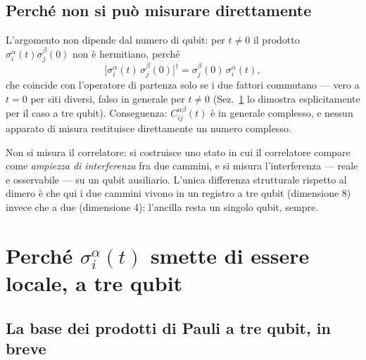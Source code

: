 \documentclass[11pt,a4paper]{article}
\begin{document}
\subsection{Perché non si può misurare direttamente}

L'argomento non dipende dal numero di qubit: per $t\neq0$ il prodotto
$\sigma_i^\alpha(t)\sigma_j^\beta(0)$ non è hermitiano, perché
\begin{equation}
\big[\sigma_i^\alpha(t)\,\sigma_j^\beta(0)\big]^\dagger
= \sigma_j^\beta(0)\,\sigma_i^\alpha(t),
\end{equation}
che coincide con l'operatore di partenza solo se i due fattori commutano --- vero a $t=0$ per siti
diversi, falso in generale per $t\neq0$ (Sez.~\ref{sec:spalmamento} lo dimostra esplicitamente per
il caso a tre qubit). Conseguenza: $C_{ij}^{\alpha\beta}(t)$ è in generale complesso, e nessun
apparato di misura restituisce direttamente un numero complesso.

\begin{ideabox}
Non si misura il correlatore: si costruisce uno stato in cui il correlatore compare come
\emph{ampiezza di interferenza} fra due cammini, e si misura l'interferenza --- reale e
osservabile --- su un qubit ausiliario. L'unica differenza strutturale rispetto al dimero è che
qui i due cammini vivono in un registro a tre qubit (dimensione 8) invece che a due (dimensione
4): l'ancilla resta un singolo qubit, sempre.
\end{ideabox}

\section{Perché \texorpdfstring{$\sigma_i^\alpha(t)$}{sigma\_i\^{}alpha(t)} smette di essere locale, a tre qubit}
\label{sec:spalmamento}

\subsection{La base dei prodotti di Pauli a tre qubit, in breve}
\end{document}
